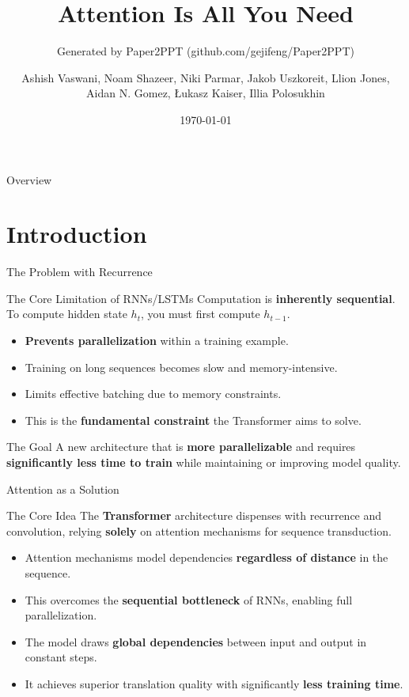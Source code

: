 \documentclass[
	11pt,
	aspectratio=169,
]{beamer}
\title[Attention Is All You...]{Attention Is All You Need}
\subtitle{Generated by Paper2PPT (github.com/gejifeng/Paper2PPT)}
\author{Ashish Vaswani, Noam Shazeer, Niki Parmar, Jakob Uszkoreit, Llion Jones, Aidan N. Gomez, Łukasz Kaiser, Illia Polosukhin}
\date{\today}
\begin{document}
\begin{frame}
	\titlepage
\end{frame}
\begin{frame}{Overview}
	\tableofcontents
\end{frame}




\section{Introduction}



\begin{frame}{The Problem with Recurrence}
    \begin{block}{The Core Limitation of RNNs/LSTMs}
    Computation is \textbf{inherently sequential}. To compute hidden state $h_t$, you must first compute $h_{t-1}$.
\end{block}

\begin{itemize}
    \item \textbf{Prevents parallelization} within a training example.
    \item Training on long sequences becomes slow and memory-intensive.
    \item Limits effective batching due to memory constraints.
    \item This is the \textbf{fundamental constraint} the Transformer aims to solve.
\end{itemize}

\begin{block}{The Goal}
    A new architecture that is \textbf{more parallelizable} and requires \textbf{significantly less time to train} while maintaining or improving model quality.
\end{block}
\end{frame}
\begin{frame}{Attention as a Solution}
    \begin{block}{The Core Idea}
    The \textbf{Transformer} architecture dispenses with recurrence and convolution, relying \textbf{solely} on attention mechanisms for sequence transduction.
\end{block}

\begin{itemize}
    \item Attention mechanisms model dependencies \textbf{regardless of distance} in the sequence.
    \item This overcomes the \textbf{sequential bottleneck} of RNNs, enabling full parallelization.
    \item The model draws \textbf{global dependencies} between input and output in constant steps.
    \item It achieves superior translation quality with significantly \textbf{less training time}.
\end{itemize}
\end{frame}
\end{document}
